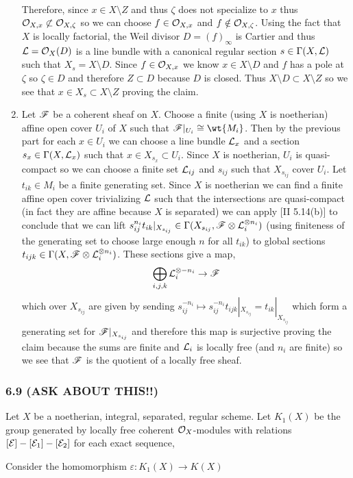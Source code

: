 \documentclass[12pt]{article}
\begin{document}
\begin{enumerate}
\bigskip\\
Therefore, since $x \in X \setminus Z$ and thus $\zeta$ does not specialize to $x$ thus $\mathcal{O}_{X, x} \not\subset \mathcal{O}_{X, \zeta}$ so we can choose $f \in \mathcal{O}_{X, x}$ and $f \notin \mathcal{O}_{X, \zeta}$. Using the fact that $X$ is locally factorial, the Weil divisor $D = (f)_{\infty}$ is Cartier and thus $\mathcal{L} = \mathcal{O}_{X}(D)$ is a line bundle with a canonical regular section $s \in \Gamma(X, \mathcal{L})$ such that $X_s = X \setminus D$. Since $f \in \mathcal{O}_{X, x}$ we know $x \in X \setminus D$ and $f$ has a pole at $\zeta$ so $\zeta \in D$ and therefore $Z \subset D$ because $D$ is closed. Thus $X \setminus D \subset X \setminus Z$ so we see that $x \in X_s \subset X \setminus Z$ proving the claim.

\item Let $\mathscr{F}$ be a coherent sheaf on $X$. Choose a finite (using $X$ is noetherian) affine open cover $U_i$ of $X$ such that $\F|_{U_i} \cong \wt{M_i}$. Then by the previous part for each $x \in U_i$ we can choose a line bundle $\mathcal{L}_x$ and a section $s_x \in \Gamma(X, \mathcal{L}_x)$ such that $x \in X_{s_x} \subset U_i$. Since $X$ is noetherian, $U_i$ is quasi-compact so we can choose a finite set $\mathcal{L}_{ij}$ and $s_{ij}$ such that $X_{s_{ij}}$ cover $U_i$. Let $t_{ik} \in M_i$ be a finite generating set. Since $X$ is noetherian we can find a finite affine open cover trivializing $\mathcal{L}$ such that the intersections are quasi-compact (in fact they are affine because $X$ is separated) we can apply [II 5.14(b)] to conclude that we can lift $ s_{ij}^{n_i} t_{ik}|_{X_{s_{ij}}} \in \Gamma(X_{s_{ij}}, \mathscr{F} \otimes \mathcal{L}_i^{\otimes n_i})$ (using finiteness of the generating set to choose large enough $n$ for all $t_{ik}$) to global sections $t_{ijk} \in \Gamma(X, \mathscr{F} \otimes \mathcal{L}_i^{\otimes n_i})$. These sections give a map,
\[ \bigoplus_{i, j, k} \mathcal{L}_i^{\otimes -n_i} \to \mathscr{F} \]
which over $X_{s_{ij}}$ are given by sending $s_{ij}^{-n_i} \mapsto s_{ij}^{-n_i} t_{ijk}|_{X_{s_{ij}}} = t_{ik}|_{X_{s_{ij}}}$ which form a generating set for $\mathscr{F}|_{X_{s_{ij}}}$ and therefore this map is surjective proving the claim because the sums are finite and $\mathcal{L}_i$ is locally free (and $n_i$ are finite) so we see that $\mathscr{F}$ is the quotient of a locally free sheaf.
\end{enumerate}

\subsubsection{6.9 (ASK ABOUT THIS!!)}

Let $X$ be a noetherian, integral, separated, regular scheme. Let $K_1(X)$ be the group generated by locally free coherent $\mathcal{O}_{X}$-modules with relations $[\mathcal{E}] - [\mathcal{E}_1] - [\mathcal{E}_2]$ for each exact sequence,
\begin{center}
\end{center}
Consider the homomorphism $\varepsilon : K_1(X) \to K(X)$
\end{document}
